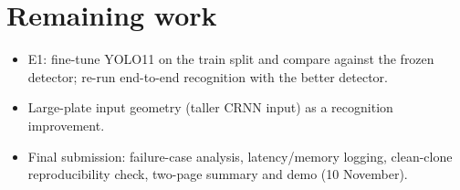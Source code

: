 \documentclass[11pt]{article}
\begin{document}
\section{Remaining work}

\begin{itemize}
\item E1: fine-tune YOLO11 on the train split and compare against the frozen
  detector; re-run end-to-end recognition with the better detector.
\item Large-plate input geometry (taller CRNN input) as a recognition
  improvement.
\item Final submission: failure-case analysis, latency/memory logging,
  clean-clone reproducibility check, two-page summary and demo
  (10 November).
\end{itemize}
\end{document}
